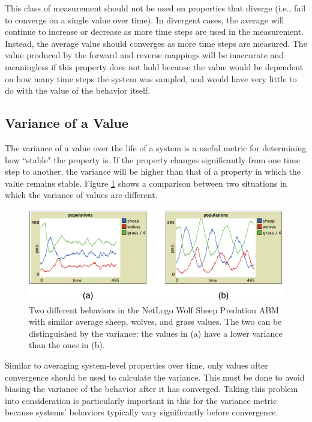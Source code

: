 This class of measurement should not be used on properties that diverge (i.e., fail to converge on a single value over time).
In divergent cases, the average will continue to increase or decrease as more time steps are used in the measurement.
Instead, the average value should converges as more time steps are measured.
The value produced by the forward and reverse mappings will be inaccurate and meaningless if this property does not hold because the value would be dependent on how many time steps the system was sampled, and would have very little to do with the value of the behavior itself.

\subsection{Variance of a Value}
The variance of a value over the life of a system is a useful metric for determining how ``stable" the property is.
If the property changes significantly from one time step to another, the variance will be higher than that of a property in which the value remains stable.
Figure \ref{fig:variance_compare} shows a comparison between two situations in which the variance of values are different.

\begin{figure}[ht]
\centering
\includegraphics{images/variance_comparison.pdf}
\caption{Two different behaviors in the NetLogo Wolf Sheep Predation ABM with similar average sheep, wolves, and grass values. The two can be distinguished by the variance: the values in (a) have a lower variance than the ones in (b).}
\label{fig:variance_compare}
\end{figure}

Similar to averaging system-level properties over time, only values after convergence should be used to calculate the variance.
This must be done to avoid biasing the variance of the behavior after it has converged.
Taking this problem into consideration is particularly important in this for the variance metric because systems' behaviors typically vary significantly before convergence.


